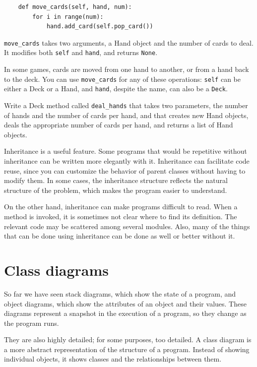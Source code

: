 \documentclass[10pt]{book}
\begin{document}
{\begin{verbatim}
    def move_cards(self, hand, num):
        for i in range(num):
            hand.add_card(self.pop_card())
\end{verbatim}
\afterverb
%
\verb"move_cards" takes two arguments, a Hand object and the number of
cards to deal.  It modifies both {\tt self} and {\tt hand}, and
returns {\tt None}.

In some games, cards are moved from one hand to another,
or from a hand back to the deck.  You can use \verb"move_cards"
for any of these operations: {\tt self} can be either a Deck
or a Hand, and {\tt hand}, despite the name, can also be a {\tt Deck}.

\begin{ex}
Write a Deck method called \verb"deal_hands" that takes two
parameters, the number of hands and the number of cards per
hand, and that creates new Hand objects, deals the appropriate
number of cards per hand, and returns a list of Hand objects.
\end{ex}

Inheritance is a useful feature.  Some programs that would be
repetitive without inheritance can be written more elegantly
with it.  Inheritance can facilitate code reuse, since you can
customize the behavior of parent classes without having to modify
them.  In some cases, the inheritance structure reflects the natural
structure of the problem, which makes the program easier to
understand.

On the other hand, inheritance can make programs difficult to read.
When a method is invoked, it is sometimes not clear where to find its
definition.  The relevant code may be scattered among several modules.
Also, many of the things that can be done using inheritance can be
done as well or better without it.  


\section{Class diagrams}

So far we have seen stack diagrams, which show the state of
a program, and object diagrams, which show the attributes
of an object and their values.  These diagrams represent a snapshot
in the execution of a program, so they change as the program
runs.

They are also highly detailed; for some purposes, too
detailed.  A class diagram is a more abstract representation
of the structure of a program.  Instead of showing individual
objects, it shows classes and the relationships between them.

}
\end{document}
